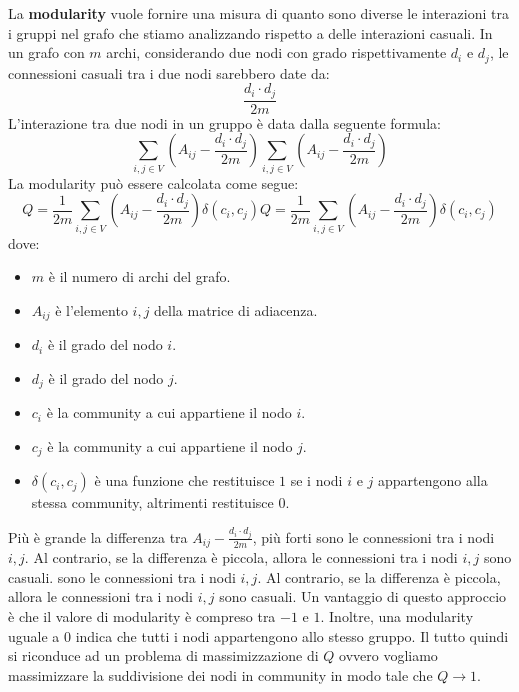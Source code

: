 La \textbf{modularity} vuole fornire una misura di quanto sono diverse le
interazioni tra i gruppi nel grafo che stiamo analizzando rispetto a delle
interazioni casuali. In un grafo con $m$ archi, considerando due nodi con grado
rispettivamente $d_i$ e $d_j$, le connessioni casuali tra i due nodi sarebbero
date da:
\begin{equation}
    \frac{d_i \cdot d_j}{2m}
\end{equation}
L'interazione tra due nodi in un gruppo è data dalla seguente formula:
\begin{equation}
    \sum_{i, j\in V}\left(A_{ij} - \frac{d_i \cdot d_j}{2m}\right)
    \sum_{i, j\in V}\left(A_{ij} - \frac{d_i \cdot d_j}{2m}\right)
\end{equation}
La modularity può essere calcolata come segue:
\begin{equation}
    Q = \frac{1}{2m} \sum_{i, j\in V} \left( A_{ij} - \frac{d_i \cdot d_j}{2m} \right) \delta(c_i, c_j)
    Q = \frac{1}{2m} \sum_{i, j\in V} \left( A_{ij} - \frac{d_i \cdot d_j}{2m} \right) \delta(c_i, c_j)
\end{equation}
dove:
\begin{itemize}
    \item $m$ è il numero di archi del grafo.
    \item $A_{ij}$ è l'elemento $i, j$ della matrice di adiacenza.
    \item $d_i$ è il grado del nodo $i$.
    \item $d_j$ è il grado del nodo $j$.
    \item $c_i$ è la community a cui appartiene il nodo $i$.
    \item $c_j$ è la community a cui appartiene il nodo $j$.
    \item $\delta(c_i, c_j)$ è una funzione che restituisce $1$ se i nodi $i$ e
          $j$ appartengono alla stessa community, altrimenti restituisce $0$.
\end{itemize}

Più è grande la differenza tra $A_{ij} - \frac{d_i \cdot d_j}{2m}$, più forti
sono le connessioni tra i nodi $i,j$. Al contrario, se la differenza è piccola,
allora le connessioni tra i nodi $i,j$ sono casuali.
sono le connessioni tra i nodi $i,j$. Al contrario, se la differenza è piccola,
allora le connessioni tra i nodi $i,j$ sono casuali.
Un vantaggio di questo approccio è che il valore di modularity è compreso tra
$-1$ e $1$. Inoltre, una modularity uguale a $0$ indica che tutti i nodi
appartengono allo stesso gruppo. Il tutto quindi si riconduce ad un problema di
massimizzazione di $Q$ ovvero vogliamo massimizzare la suddivisione dei nodi in
community in modo tale che $Q\to 1$.

